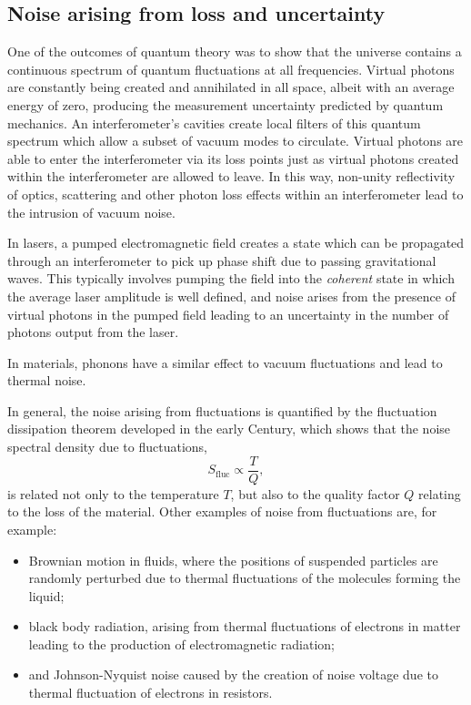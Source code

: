 \subsection{\label{sec:noise-via-loss}Noise arising from loss and uncertainty}
One of the outcomes of quantum theory was to show that the universe contains a continuous spectrum of quantum fluctuations at all frequencies. Virtual photons are constantly being created and annihilated in all space, albeit with an average energy of zero, producing the measurement uncertainty predicted by quantum mechanics. An interferometer's cavities create local filters of this quantum spectrum which allow a subset of vacuum modes to circulate. Virtual photons are able to enter the interferometer via its loss points just as virtual photons created within the interferometer are allowed to leave. In this way, non-unity reflectivity of optics, scattering and other photon loss effects within an interferometer lead to the intrusion of vacuum noise.

In lasers, a pumped electromagnetic field creates a state which can be propagated through an interferometer to pick up phase shift due to passing gravitational waves. This typically involves pumping the field into the \emph{coherent} state in which the average laser amplitude is well defined, and noise arises from the presence of virtual photons in the pumped field leading to an uncertainty in the number of photons output from the laser.

In materials, phonons  have a similar effect to vacuum fluctuations and lead to thermal noise.

In general, the noise arising from fluctuations is quantified by the fluctuation dissipation theorem developed in the early  Century, which shows that the noise spectral density due to fluctuations,
\begin{equation}
  S_{\text{fluc}} \propto \frac{T}{Q},
\end{equation}
is related not only to the temperature $T$, but also to the quality factor $Q$ relating to the loss of the material. Other examples of noise from fluctuations are, for example:
\begin{itemize}
  \item Brownian motion in fluids, where the positions of suspended particles are randomly perturbed due to thermal fluctuations of the molecules forming the liquid;
  \item black body radiation, arising from thermal fluctuations of electrons in matter leading to the production of electromagnetic radiation;
  \item and Johnson-Nyquist noise caused by the creation of noise voltage due to thermal fluctuation of electrons in resistors.
\end{itemize}

